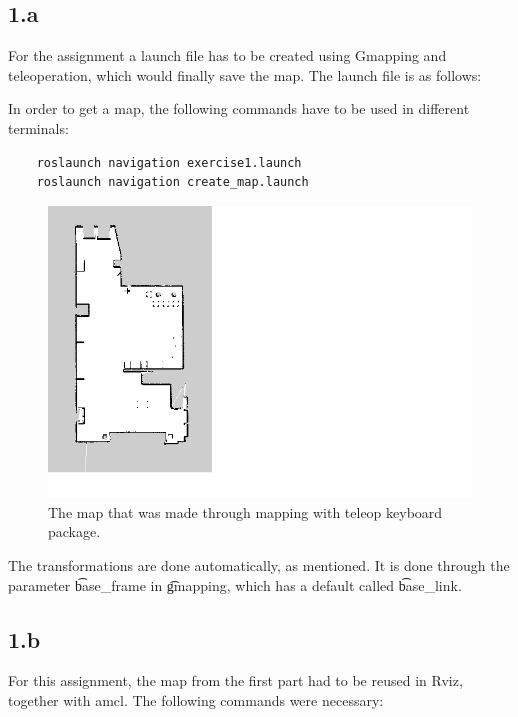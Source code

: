 
\subsection*{1.a}
For the assignment a launch file has to be created using Gmapping and teleoperation, which would finally save the map. The launch file is as follows:



In order to get a map, the following commands have to be used in different terminals:

\begin{lstlisting}
	roslaunch navigation exercise1.launch
	roslaunch navigation create_map.launch
\end{lstlisting}

\begin{figure}[h!]
	\centering
	\includegraphics[width=\textwidth]{./img/map_teleop.png}
	\caption{The map that was made through mapping with teleop keyboard package.}
	\label{fig:1:map}
\end{figure}

The transformations are done automatically, as mentioned. It is done through the parameter \t{base_frame} in \t{gmapping}, which has a default called \t{base_link}.

\subsection*{1.b}

For this assignment, the map from the first part had to be reused in Rviz, together with amcl. The following commands were necessary:

